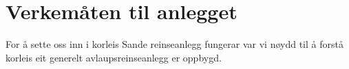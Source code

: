 \chapter{Verkemåten til anlegget}\label{sec:6}
\thispagestyle{fancy}

For å sette oss inn i korleis Sande reinseanlegg fungerar var vi nøydd til å forstå
korleis eit generelt avlaupsreinseanlegg er oppbygd.



